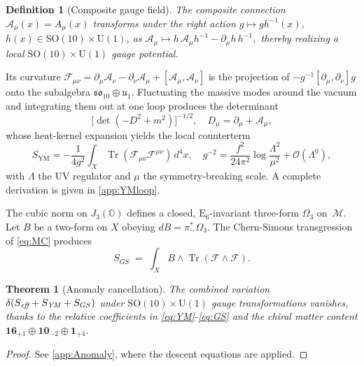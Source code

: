 \documentclass[pdflatex,sn-mathphys-num]{sn-jnl}
\theoremstyle{thmstyleone}
\newtheorem{theorem}{Theorem}
\theoremstyle{thmstyletwo}%
\theoremstyle{thmstylethree}%
\newtheorem{definition}{Definition}%
\newcommand{\SO}[1]{\mathrm{SO(#1)}}
\newcommand{\U}[1]{\mathrm{U(#1)}}
\newcommand{\E}[1]{\mathrm{E_{#1}}}
\newcommand{\SOTen}{\SO{10}}
\newcommand{\UOne}{\U{1}}
\newcommand{\ESix}{\E{6}}
\newcommand{\Tr}{\operatorname{Tr}}
\begin{document}
\begin{definition}[Composite gauge field]
\label{def:CompositeA}
The \emph{composite connection}
\(
  \mathcal A_\mu(x)=A_\mu(x)
\)
transforms under the right action \(g\mapsto gh^{-1}(x)\),
\(h(x)\in \SOTen\times \UOne\), as
\(
  \mathcal A_\mu\mapsto
  h\,\mathcal A_\mu h^{-1}-\partial_\mu h\,h^{-1},
\)
thereby realizing a local \(\SOTen\times \UOne\) gauge potential.
\end{definition}

Its curvature
\(
  \mathcal F_{\mu\nu}
   =\partial_\mu\mathcal A_\nu-\partial_\nu\mathcal A_\mu
    +[\mathcal A_\mu,\mathcal A_\nu]
 \)
is the projection of \(-g^{-1}[\partial_\mu,\partial_\nu]g\) onto the
subalgebra \(\mathfrak{so}_{10}\oplus\mathfrak u_{1}\).
Fluctuating the massive modes around the vacuum and integrating them out
at one loop produces the determinant
\[
  \bigl[\det(-D^{2}+m^{2})\bigr]^{-1/2},
  \quad
  D_\mu=\partial_\mu+\mathcal A_\mu,
\]
whose heat-kernel expansion yields the local counterterm
\begin{equation}\label{eq:YM}
  S_{\text{YM}}
  = -\frac{1}{4g^{2}}
    \int_{X}\Tr(\mathcal F_{\mu\nu}\mathcal F^{\mu\nu})\,d^{4}x,
  \quad
  g^{-2}
  =\frac{f^{2}}{24\pi^{2}}\log\frac{\Lambda^{2}}{\mu^{2}}
  +\mathcal O(\Lambda^{0}),
\end{equation}
with $\Lambda$ the UV regulator and $\mu$ the symmetry-breaking scale.
A complete derivation is given in \autoref{app:YMloop}.

The cubic norm on $J_{3}(\mathbb{O})$ defines a closed, $\ESix$-invariant 
three-form \(\Omega_{3}\) on~$\mathcal M$.
Let \(B\) be a two-form on $X$ obeying
\(dB=\pi_-^{*}\Omega_{3}\).
The Chern-Simons transgression of \eqref{eq:MC} produces
\begin{equation}\label{eq:GS}
  S_{GS}
  \;=\;
  \int_{X}
     B\wedge\Tr(\mathcal F\wedge\mathcal F).
\end{equation}

\begin{theorem}[Anomaly cancellation]\label{thm:Anomaly}
The combined variation
\(\delta(S_{\emph{eff}}+S_{\text{\emph{YM}}}+S_{GS})\)
under \(\SOTen\times \UOne\) gauge transformations vanishes, thanks to
the relative coefficients in \eqref{eq:YM}-\eqref{eq:GS} and the
chiral matter content
\(\mathbf{16}_{+1}\oplus\mathbf{10}_{-2}\oplus\mathbf{1}_{+4}\).
\end{theorem}

\begin{proof}
See \autoref{app:Anomaly}, where the descent equations
\cite{AlvarezGaumeWitten:1984} are applied.
\end{proof}
\end{document}
